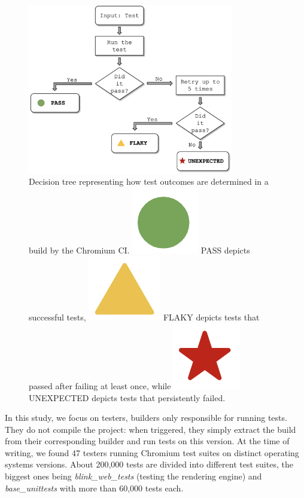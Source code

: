 \begin{figure}[ht]
\centering
\includegraphics[width=0.8\textwidth]{figures/chromium/gui_process_final.png}
\vspace{-1.0em}
\caption{Decision tree representing how test outcomes are determined in a build by the Chromium CI. \includegraphics[scale=0.2]{figures/chromium/pass.png} PASS depicts successful tests, \includegraphics[scale=0.2]{figures/chromium/flaky.png} FLAKY depicts tests that passed after failing at least once, while \includegraphics[scale=0.2]{figures/chromium/fail.png} UNEXPECTED depicts tests that persistently failed.}
\label{fig:decision-tree}
\end{figure}

In this study, we focus on testers, \ie builders only responsible for running tests. They do not compile the project: when triggered, they simply extract the build from their corresponding builder and run tests on this version. At the time of writing, we found 47 testers running Chromium test suites on distinct operating systems versions. About 200,000 tests are divided into different test suites, the biggest ones being \textit{blink\_web\_tests} (testing the rendering engine) and \textit{base\_unittests} with more than 60,000 tests each.

